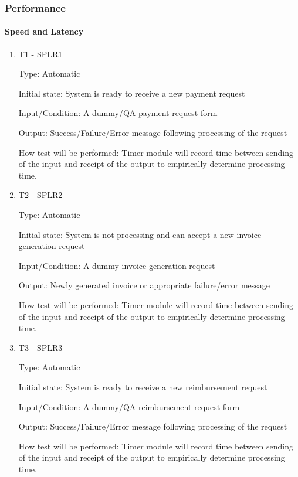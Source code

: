 \documentclass[12pt, titlepage]{article}
\begin{document}



\subsubsection{Performance}
		
\paragraph{Speed and Latency}

\begin{enumerate}

\item{T1 - SPLR1\\}

Type: Automatic

Initial state: System is ready to receive a new payment request

Input/Condition: A dummy/QA payment request form

Output: Success/Failure/Error message following processing of the request

How test will be performed: Timer module will record time between sending of the input and receipt of the output to empirically determine processing time.
 
					
\item{T2 - SPLR2\\}

Type: Automatic

Initial state: System is not processing and can accept a new invoice generation request

Input/Condition: A dummy invoice generation request

Output: Newly generated invoice or appropriate failure/error message

How test will be performed: Timer module will record time between sending of the input and receipt of the output to empirically determine processing time.

\item{T3 - SPLR3\\}

Type: Automatic

Initial state: System is ready to receive a new reimbursement request

Input/Condition: A dummy/QA reimbursement request form

Output: Success/Failure/Error message following processing of the request

How test will be performed: Timer module will record time between sending of the input and receipt of the output to empirically determine processing time.

\end{enumerate}
\end{document}
